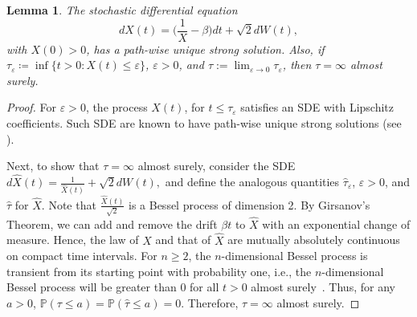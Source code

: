 \documentclass[11pt, reqno]{article}
\newtheorem{lemma}[theorem]{Lemma}
\numberwithin{equation}{section}
\numberwithin{theorem}{section}
\begin{document}
\begin{lemma}\label{lem:SDE-SOL}
The stochastic differential equation
\begin{equation}\label{eq:SDE-SOL}
    dX(t)=\Big(\frac{1}{X}-\beta\Big)dt +\sqrt{2}dW(t),
\end{equation}
with $X(0)>0$,
has a path-wise unique strong solution. Also, if $\tau_{\varepsilon}\coloneqq \inf\{t>0:X(t) \le \varepsilon\}$, $\varepsilon>0$, and $\tau :=\lim_{\varepsilon\rightarrow0}\tau_{\varepsilon}$, then $\tau=\infty$ almost surely.
\end{lemma}
\begin{proof}
For $\varepsilon>0$, the process $X(t)$, for $t\leq \tau_{\varepsilon}$ satisfies an SDE with Lipschitz coefficients. 
Such SDE are known to have path-wise unique strong solutions (see \cite[Theorem V.11.2]{RW00}).

Next, to show that $\tau=\infty$ almost surely, consider the SDE 
$d\hat{X}(t)=\frac{1}{\hat{X}(t)} +\sqrt{2}dW(t),$
and define the analogous quantities $\hat{\tau}_{\varepsilon}$, $\varepsilon>0$, and $\hat {\tau}$ for $\hat{X}$.
Note that $\frac{\hat{X}(t)}{\sqrt{2}} $ is a Bessel process of dimension 2. 
By Girsanov's Theorem, we can add and remove the drift $\beta t$ to $\hat{X}$ with an exponential change of measure. Hence, the law of $X$ and that of $\hat{X}$ are mutually absolutely continuous on compact time intervals. 
For $n\geq 2$, the $n$-dimensional Bessel process  is transient from its starting point with probability one, i.e., the $n$-dimensional Bessel process will be greater than 0 for all $t>0$ almost surely~\cite[\S 3.3.C]{KS14}.
Thus, for any $a>0$, $\mathbb{P}(\tau \le a) = \mathbb{P}(\hat{\tau} \le a)=0$.
Therefore, $\tau=\infty$ almost surely.
\end{proof}
\end{document}
